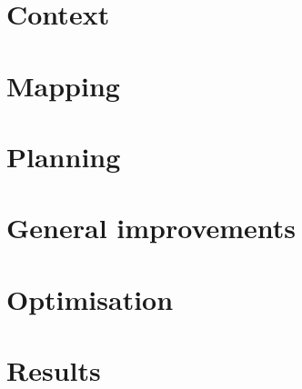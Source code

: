 \documentclass{report}
\begin{document}


\tableofcontents

\chapter{Context}


\chapter{Mapping}


\chapter{Planning}


\chapter{General improvements}


\chapter{Optimisation}


\chapter{Results}


\listofalgorithms
{}

\nocite{*}


\end{document}
